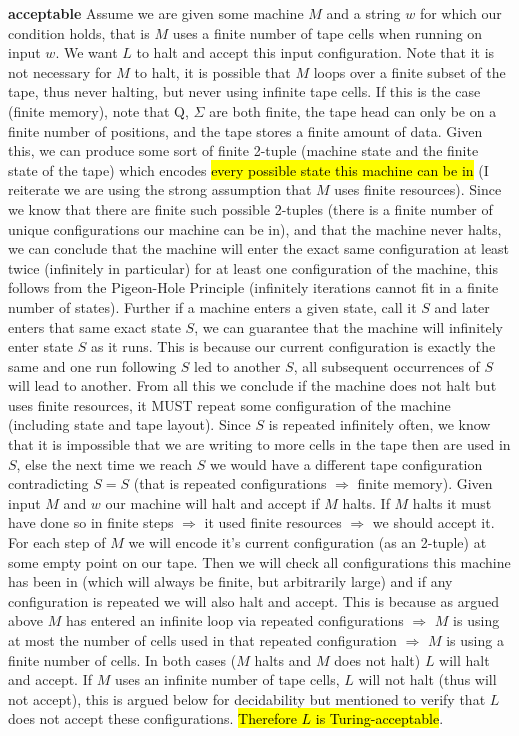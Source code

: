 \documentclass[12pt]{jhwhw}
\newcommand{\hlgreen}[1]{{\sethlcolor{lime}\hl{#1}}}
\begin{document}
	\textbf{acceptable} Assume we are given some machine $M$ and a string $w$ for which our condition holds, that
		is $M$ uses a finite number of tape cells when running on input $w$. We want $L$ to halt and accept
		this input configuration. Note that it is not necessary for $M$ to halt, it is possible that $M$ loops
		over a finite subset of the tape, thus never halting, but never using infinite tape cells.
		If this is the case (finite memory), note that Q, $\Sigma$ are both finite, the tape head can only
		be on a finite number of positions, and the tape stores a finite amount of data. Given this, we can
		produce some sort of finite 2-tuple (machine state and the finite state of the tape) 
		which encodes \hl{every possible state this machine can be in} (I reiterate
		we are using the strong assumption that $M$ uses finite resources). Since we know that there are finite
		such possible 2-tuples (there is a finite number of unique configurations our machine can be in), and
		that the machine never halts, we can conclude that the machine will enter the exact same configuration
		at least twice (infinitely in particular) for at least one configuration of the machine, this follows from
		the Pigeon-Hole Principle (infinitely iterations cannot fit in a finite number of states).
		Further if a machine enters a given state, call it $S$ and later enters that same exact state $S$, we can
		guarantee that the machine will infinitely enter state $S$ as it runs. This is because our 
		current configuration is exactly the same and one run following $S$ led to another $S$, 
		all subsequent occurrences of $S$ will lead to another. 
		\bigbreak
		From all this we conclude if the machine does not halt but uses
		finite resources, it MUST repeat some configuration of the machine (including state and tape layout).
		Since $S$ is repeated infinitely often, we know that it is impossible that we are writing to more
		cells in the tape then are used in $S$, else the next time we reach $S$ we would have a different tape
		configuration contradicting $S=S$ (that is repeated configurations $\Rightarrow$ finite memory).
		\bigbreak
		Given input $M$ and $w$ our machine will halt and accept if $M$ halts. If $M$ halts it must have done
		so in finite steps $\Rightarrow$ it used finite resources $\Rightarrow$ we should accept it. For each
		step of $M$ we will encode it's current configuration (as an 2-tuple) at some empty point on our tape.
		Then we will check all configurations this machine has been in (which will always be finite, but arbitrarily
		large) and if any configuration is repeated we will also halt and accept. This is because as argued
		above $M$ has entered an infinite loop via repeated configurations $\Rightarrow$ $M$ is using at most
		the number of cells used in that repeated configuration $\Rightarrow$ $M$ is using
		a finite number of cells. In both cases ($M$ halts and $M$ does not halt) $L$ will halt and accept.
		\bigbreak
		If $M$ uses an infinite number of tape cells, $L$ will not halt (thus will not accept), 
		this is argued below for decidability but mentioned to verify that $L$ does not accept these configurations.
		\hlgreen{Therefore $L$ is Turing-acceptable}.
\end{document}
